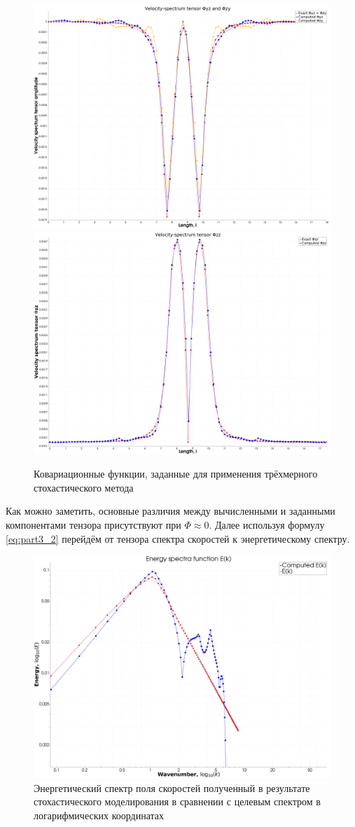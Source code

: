 \begin{figure}[!h]
{        \hfill
        {\includegraphics[width=0.34\linewidth]{images/kriging/3components/phi_23_32_diagonal.png}}
        \hfill
        {\includegraphics[width=0.34\linewidth]{images/kriging/3components/phi_33_diagonal.png}}
        \hfill
    }
    
    \caption{Ковариационные функции, заданные для применения трёхмерного стохастического метода}
    \label{img:exact_covariance_comparison_heat_maps}  
\end{figure}

Как можно заметить, основные различия между вычисленными и заданными компонентами тензора присутствуют при $\Phi \approx 0$. Далее используя формулу \eqref{eq:part3_2} перейдём от тензора спектра скоростей к энергетическому спектру. 

\begin{figure}[ht] 
  \center
  \includegraphics [width=0.9\linewidth] {images/kriging/3components/energy_function_kriging_loglog.png}
  \caption{Энергетический спектр поля скоростей полученный в результате стохастического моделирования в сравнении с целевым спектром в логарифмических координатах} 
  \label{img:kriging_spectra_function_compare}  
\end{figure}

